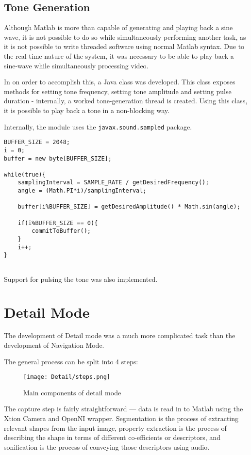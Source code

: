 \subsection{Tone Generation}
Although Matlab is more than capable of generating and playing back a sine wave, it is not possible to do so while simultaneously performing another task, as it is not possible to write threaded software using normal Matlab syntax. Due to the real-time nature of the system, it was necessary to be able to play back a sine-wave while simultaneously processing video.

In on order to accomplish this, a Java class was developed. This class exposes methods for setting tone frequency, setting tone amplitude and setting pulse duration - internally, a worked tone-generation thread is created. Using this class, it is possible to play back a tone in a non-blocking way. 

Internally, the module uses the \texttt{javax.sound.sampled} package. 

\begin{verbatim}
BUFFER_SIZE = 2048;
i = 0;
buffer = new byte[BUFFER_SIZE];

while(true){
    samplingInterval = SAMPLE_RATE / getDesiredFrequency();
    angle = (Math.PI*i)/samplingInterval;

    buffer[i%BUFFER_SIZE] = getDesiredAmplitude() * Math.sin(angle);

    if(i%BUFFER_SIZE == 0){
        commitToBuffer();
    }
    i++;
}
    
\end{verbatim}

Support for pulsing the tone was also implemented. 


\section{Detail Mode}
The development of Detail mode was a much more complicated task than the development of Navigation Mode.

The general process can be split into 4 steps:

\begin{figure}[H]
    \centering
    \texttt{[image: Detail/steps.png]}
    \caption{Main components of detail mode}
\end{figure}

The capture step is fairly straightforward --- data is read in to Matlab using the Xtion Camera and OpenNI wrapper. Segmentation is the process of extracting relevant shapes from the input image, property extraction is the process of describing the shape in terms of different co-efficients or descriptors, and sonification is the process of conveying those descriptors using audio. 


